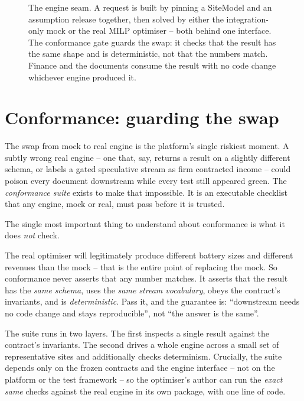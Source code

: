 \begin{figure}[H]
{}
\caption{The engine seam. A request is built by pinning a SiteModel and an assumption release together, then solved by either the integration-only mock or the real MILP optimiser -- both behind one interface. The conformance gate guards the swap: it checks that the result has the same shape and is deterministic, not that the numbers match. Finance and the documents consume the result with no code change whichever engine produced it.}
\label{fig:seam}
\end{figure}

\section{Conformance: guarding the swap}
\label{sec:conformance}

The swap from mock to real engine is the platform's single riskiest moment. A subtly wrong real engine -- one that, say, returns a result on a slightly different schema, or labels a gated speculative stream as firm contracted income -- could poison every document downstream while every test still appeared green. The \emph{conformance suite} exists to make that impossible. It is an executable checklist that any engine, mock or real, must pass before it is trusted.

The single most important thing to understand about conformance is what it does \emph{not} check.

\begin{keyidea}
The real optimiser will legitimately produce different battery sizes and different revenues than the mock -- that is the entire point of replacing the mock. So conformance never asserts that any number matches. It asserts that the result has the \emph{same schema}, uses the \emph{same stream vocabulary}, obeys the contract's invariants, and is \emph{deterministic}. Pass it, and the guarantee is: ``downstream needs no code change and stays reproducible'', not ``the answer is the same''.
\end{keyidea}

The suite runs in two layers. The first inspects a single result against the contract's invariants. The second drives a whole engine across a small set of representative sites and additionally checks determinism. Crucially, the suite depends only on the frozen contracts and the engine interface -- not on the platform or the test framework -- so the optimiser's author can run the \emph{exact same} checks against the real engine in its own package, with one line of code.

